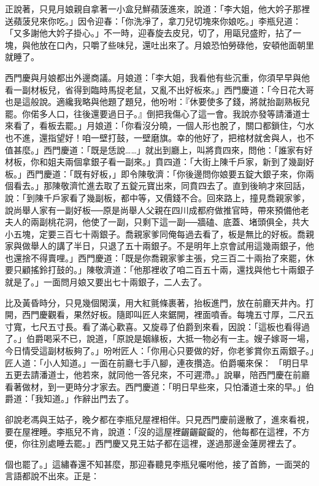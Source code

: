 正說著，只見月娘親自拿著一小盒兒鮮蘋菠進來，說道：「李大姐，他大妗子那裡送蘋菠兒來你吃。」因令迎春：「你洗凈了，拿刀兒切塊來你娘吃。」李瓶兒道： 「又多謝他大妗子掛心。」不一時，迎春旋去皮兒，切了，用甌兒盛貯，拈了一塊，與他放在口內，只嚼了些味兒，還吐出來了。月娘恐怕勞碌他，安頓他面朝里就睡了。

西門慶與月娘都出外邊商議。月娘道：「李大姐，我看他有些沉重，你須早早與他看一副材板兒，省得到臨時馬捉老鼠，又亂不出好板來。」西門慶道：「今日花大哥也是這般說。適纔我略與他題了題兒，他吩咐：『休要使多了錢，將就抬副熟板兒罷。你偌多人口，往後還要過日子。』倒把我傷心了這一會。我說亦發等請潘道士來看了，看板去罷。」月娘道：「你看沒分曉，一個人形也脫了，關口都鎖住，勺水也不進，還指望好！咱一壁打鼓，一壁磨旗。幸的他好了，把棺材就舍與人，也不值甚麼。」西門慶道：「既是恁說……」就出到廳上，叫將賁四來，問他：「誰家有好材板，你和姐夫兩個拿銀子看一副來。」賁四道：「大街上陳千戶家，新到了幾副好板。」西門慶道：「既有好板，」即令陳敬濟：「你後邊問你娘要五錠大銀子來，你兩個看去。」那陳敬濟忙進去取了五錠元寶出來，同賁四去了。直到後晌才來回話，說：「到陳千戶家看了幾副板，都中等，又價錢不合。回來路上，撞見喬親家爹，說尚舉人家有一副好板──原是尚舉人父親在四川成都府做推官時，帶來預備他老夫人的兩副桃花洞，他使了一副，只剩下這一副──牆磕、底蓋、堵頭俱全，共大小五塊，定要三百七十兩銀子。喬親家爹同俺每過去看了，板是無比的好板。喬親家與做舉人的講了半日，只退了五十兩銀子。不是明年上京會試用這幾兩銀子，他也還捨不得賣哩。」西門慶道：「既是你喬親家爹主張，兌三百二十兩抬了來罷，休要只顧搖鈴打鼓的。」陳敬濟道：「他那裡收了咱二百五十兩，還找與他七十兩銀子就是了。」一面問月娘又要出七十兩銀子，二人去了。

比及黃昏時分，只見幾個閑漢，用大紅氈條裹著，抬板進門，放在前廳天井內。打開，西門慶觀看，果然好板。隨即叫匠人來鋸開，裡面噴香。每塊五寸厚，二尺五寸寬，七尺五寸長。看了滿心歡喜。又旋尋了伯爵到來看，因說：「這板也看得過了。」伯爵喝采不已，說道，「原說是姻緣板，大抵一物必有一主。嫂子嫁哥一場，今日情受這副材板夠了。」吩咐匠人：「你用心只要做的好，你老爹賞你五兩銀子。」匠人道：「小人知道。」一面在前廳七手八腳，連夜攢造。伯爵囑來保： 「明日早五更去請潘道士，他若來，就同他一答兒來，不可遲滯。」說畢，陪西門慶在前廳看著做材，到一更時分才家去。西門慶道：「明日早些來，只怕潘道士來的早。」伯爵道：「我知道。」作辭出門去了。

卻說老馮與王姑子，晚夕都在李瓶兒屋裡相伴。只見西門慶前邊散了，進來看視，要在屋裡睡。李瓶兒不肯，說道：「沒的這屋裡齷齷齪齪的，他每都在這裡，不方便，你往別處睡去罷。」西門慶又見王姑子都在這裡，遂過那邊金蓮房裡去了。

個也罷了。」這繡春還不知甚麼，那迎春聽見李瓶兒囑咐他，接了首飾，一面哭的言語都說不出來。正是：

